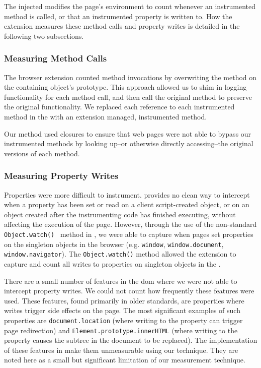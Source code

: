 The injected \JS modifies the page's environment to count whenever an
instrumented method is called, or that an instrumented property is written to.
How the extension measures these method calls and property writes is detailed
in the following two subsections.


\subsubsection{Measuring Method Calls}
The browser extension counted method invocations by overwriting the method on
the containing object's prototype.  This approach allowed us to shim in
logging functionality for each method call, and then call the original method
to preserve the original functionality.  We replaced each reference to each
instrumented method in the \WAPI with an extension managed, instrumented
method.

Our method used \JS closures to ensure that web pages were not able to bypass
our instrumented methods by looking up--or otherwise directly
accessing--the original versions of each method.


\subsubsection{Measuring Property Writes}
Properties were more difficult to instrument.  \JS provides no clean way to
intercept when a property has been set or read on a client script-created
object, or on an object created after the instrumenting code has finished
executing, without affecting the execution of the page.  However, through the
use of the non-standard \texttt{Object.watch()}~\cite{mozillaobjectwatch}
method in \FF, we were able to capture when pages set properties on the
singleton objects in the browser (e.g. \texttt{window},
\texttt{window.document}, \texttt{window.navigator}).  The
\texttt{Object.watch()} method allowed the extension to capture and count all
writes to properties on singleton objects in the \WAPI.

There are a small number of features in the \gls{dom} where we were not able to
intercept property writes. We could not count how frequently
these features were used.  These features, found primarily in older standards,
are properties where writes trigger side effects on the page.  The most
significant examples of such properties are \texttt{document.location} (where
writing to the property can trigger page redirection) and
\texttt{Element.prototype.innerHTML} (where writing to the property causes the
subtree in the document to be replaced).  The implementation of these features
in \FF make them unmeasurable using our technique.  They are noted here as a
small but significant limitation of our measurement technique.


